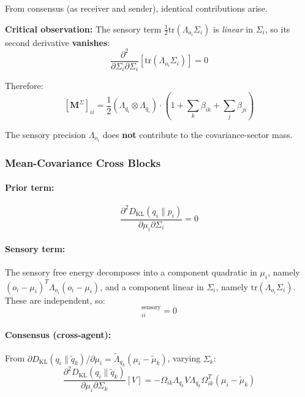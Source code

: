 \documentclass[12pt]{article}
\begin{document}
From consensus (as receiver and sender), identical contributions arise.

\textbf{Critical observation:} The sensory term $\frac{1}{2}\mathrm{tr}(\Lambda_{o_i}\Sigma_i)$ is \textit{linear} in $\Sigma_i$, so its second derivative \textbf{vanishes}:
\begin{equation}
\frac{\partial^2}{\partial \Sigma_i \partial \Sigma_i}\left[\mathrm{tr}(\Lambda_{o_i}\Sigma_i)\right] = 0
\end{equation}

Therefore:
\begin{equation}
\boxed{
[\mathbf{M}^\Sigma]_{ii} = \frac{1}{2}(\Lambda_{q_i} \otimes \Lambda_{q_i}) \cdot \left(1 + \sum_k \beta_{ik} + \sum_j \beta_{ji}\right)
}
\label{eq:mass_covariance}
\end{equation}

The sensory precision $\Lambda_{o_i}$ does \textbf{not} contribute to the covariance-sector mass.

\subsubsection{Mean-Covariance Cross Blocks}

\paragraph{Prior term:}
\begin{equation}
\frac{\partial^2 D_{\mathrm{KL}}(q_i \| p_i)}{\partial \mu_i \partial \Sigma_i} = 0
\end{equation}

\paragraph{Sensory term:} The sensory free energy decomposes into a component quadratic in $\mu_i$, namely $(o_i - \mu_i)^T\Lambda_{o_i}(o_i - \mu_i)$, and a component linear in $\Sigma_i$, namely $\mathrm{tr}(\Lambda_{o_i}\Sigma_i)$. These are independent, so:
\begin{equation}
[\mathbf{C}^{\mu\Sigma}]_{ii}^{\text{sensory}} = 0
\end{equation}

\paragraph{Consensus (cross-agent):} From $\partial D_{\mathrm{KL}}(q_i \| \tilde{q}_k)/\partial \mu_i = \tilde{\Lambda}_{q_k}(\mu_i - \tilde{\mu}_k)$, varying $\Sigma_k$:
\begin{equation}
\frac{\partial^2 D_{\mathrm{KL}}(q_i \| \tilde{q}_k)}{\partial \mu_i \partial \Sigma_k}[V] = -\Omega_{ik}\Lambda_{q_k}V\Lambda_{q_k}\Omega_{ik}^T(\mu_i - \tilde{\mu}_k)
\end{equation}
\end{document}

